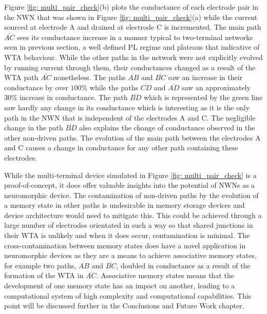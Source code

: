 Figure \ref{fig: multi_pair_check}(b) plots the conductance of each electrode pair in the NWN that was shown in Figure \ref{fig: multi_pair_check}(a) while the current sourced at electrode A and drained at electrode C is incremented. The main path $\overline{AC}$ sees its conductance increase in a manner typical to two-terminal networks seen in previous section, a well defined PL regime and plateaus that indicative of WTA behaviour. While the other paths in the network were not explicitly evolved by running current through them, their conductances changed as a result of the WTA path $\overline{AC}$ nonetheless. The paths $\overline{AB}$ and $\overline{BC}$ saw an increase in their conductance by over $100\%$ while the paths $\overline{CD}$ and $\overline{AD}$ saw an approximately $30\%$ increase in conductance. The path $\overline{BD}$ which is represented by the green line saw hardly any change in its conductance which is interesting as it is the only path in the NWN that is independent of the electrodes A and C. The negligible change in the path $\overline{BD}$ also explains the change of conductance observed in the other non-driven paths. The evolution of the main path between the electrodes A and C causes a change in conductance for any other path containing these electrodes.  

While the multi-terminal device simulated in Figure \ref{fig: multi_pair_check} is a proof-of-concept, it does offer valuable insights into the potential of NWNs as a neuromorphic device. The contamination of non-driven paths by the evolution of a memory state in other paths is undesirable in memory storage devices and device architecture would need to mitigate this. This could be achieved through a large number of electrodes orientated in such a way so that shared junctions in their WTA is unlikely and when it does occur, contamination is minimal. The cross-contamination between memory states does have a novel application in neuromorphic devices as they are a means to achieve associative memory states\cite{pershin2010}, for example two paths, $\overline{AB}$ and $\overline{BC}$, doubled in conductance as a result of the formation of the WTA in $\overline{AC}$. Associative memory states means that the development of one memory state has an impact on another, leading to a computational system of high complexity and computational capabilities. This point will be discussed further in the Conclusions and Future Work chapter.


